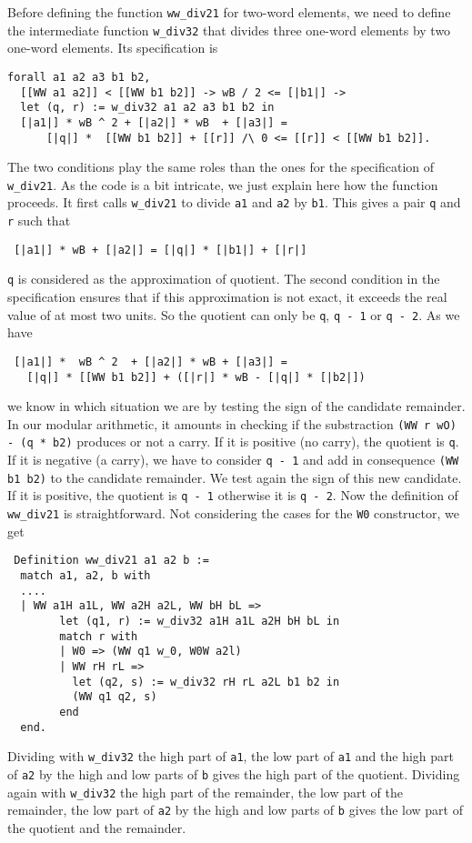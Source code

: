 Before defining the function {\tt ww\_div21} for two-word elements,
we need to define the intermediate function  {\tt w\_div32}
that divides three one-word elements by two one-word elements.
Its specification is
\begin{verbatim}
forall a1 a2 a3 b1 b2, 
  [[WW a1 a2]] < [[WW b1 b2]] -> wB / 2 <= [|b1|] ->
  let (q, r) := w_div32 a1 a2 a3 b1 b2 in
  [|a1|] * wB ^ 2 + [|a2|] * wB  + [|a3|] =  
      [|q|] *  [[WW b1 b2]] + [[r]] /\ 0 <= [[r]] < [[WW b1 b2]].
\end{verbatim}
The two conditions play the same roles than the ones for the specification of {\tt w\_div21}.
As the code is a bit intricate, we just explain here how the function
proceeds. It first calls {\tt w\_div21} to divide {\tt a1} and {\tt a2}
by {\tt b1}. This gives a pair {\tt q} and {\tt r} such that
\begin{verbatim}
 [|a1|] * wB + [|a2|] = [|q|] * [|b1|] + [|r|]
\end{verbatim}
{\tt q} is considered as the approximation of quotient.
The second condition in the specification ensures that if this approximation
is not exact, it exceeds the real value of at most two units. So the quotient 
can only be {\tt q}, {\tt q - 1} or {\tt q - 2}. 
As we have 
\begin{verbatim}
 [|a1|] *  wB ^ 2  + [|a2|] * wB + [|a3|] = 
   [|q|] * [[WW b1 b2]] + ([|r|] * wB - [|q|] * [|b2|])
\end{verbatim}
we know in which situation we are by testing the sign of the candidate
remainder.
In our modular arithmetic, it amounts in checking if the substraction   {\tt (WW r wO) - (q * b2)} 
produces or not a carry.  
If it is positive (no carry), the quotient is {\tt q}. If it is negative (a carry), we
have to consider {\tt q - 1} and add in consequence {\tt (WW b1 b2)} to the candidate remainder.
We test again the sign of this new candidate. If it is positive, the quotient is {\tt q - 1}
otherwise it is {\tt q - 2}.
Now the definition of {\tt ww\_div21} is straightforward. Not considering the cases for the {\tt W0}
constructor, we get
\begin{verbatim} 
 Definition ww_div21 a1 a2 b :=
  match a1, a2, b with
  ....  
  | WW a1H a1L, WW a2H a2L, WW bH bL =>
        let (q1, r) := w_div32 a1H a1L a2H bH bL in
        match r with
        | W0 => (WW q1 w_0, W0W a2l)
        | WW rH rL =>
          let (q2, s) := w_div32 rH rL a2L b1 b2 in
          (WW q1 q2, s)
        end
  end.
\end{verbatim}
Dividing with {\tt w\_div32} the high part of {\tt a1}, the low part of {\tt a1} and the high part of {\tt a2}
by the high and low parts of {\tt b} gives the high part of the quotient. Dividing again with {\tt w\_div32} 
the high part of the remainder, the low part of the remainder, the low part of {\tt a2} by the high and 
low parts of {\tt b} gives  the low part of the quotient and the remainder.
  

